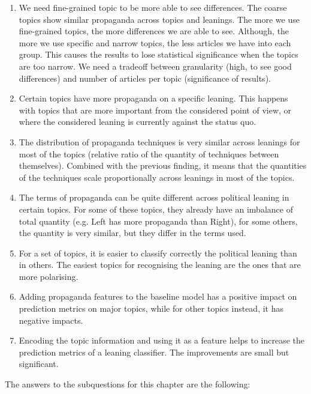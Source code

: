 \begin{enumerate}
    \item We need fine-grained topic to be more able to see differences. The coarse topics show similar propaganda across topics and leanings. The more we use fine-grained topics, the more differences we are able to see.
    Although, the more we use specific and narrow topics, the less articles we have into each group. This causes the results to lose statistical significance when the topics are too narrow.
    We need a tradeoff between granularity (high, to see good differences) and number of articles per topic (significance of results).
    \item Certain topics have more propaganda on a specific leaning. This happens with topics that are more important from the considered point of view, or where the considered leaning is currently against the status quo.
    \item The distribution of propaganda techniques is very similar across leanings for most of the topics (relative ratio of the quantity of techniques between themselves). Combined with the previous finding, it means that the quantities of the techniques scale proportionally across leanings in most of the topics.
    \item The terms of propaganda can be quite different across political leaning in certain topics. For some of these topics, they already have an imbalance of total quantity (e.g. Left has more propaganda than Right), for some others, the quantity is very similar, but they differ in the terms used.
    \item For a set of topics, it is easier to classify correctly the political leaning than in others. The easiest topics for recognising the leaning are the ones that are more polarising.
    \item Adding propaganda features to the baseline model has a positive impact on prediction metrics on major topics, while for other topics instead, it has negative impacts.
    \item Encoding the topic information and using it as a feature helps to increase the prediction metrics of a leaning classifier. The improvements are small but significant.
\end{enumerate}


The answers to the subquestions for this chapter are the following:

